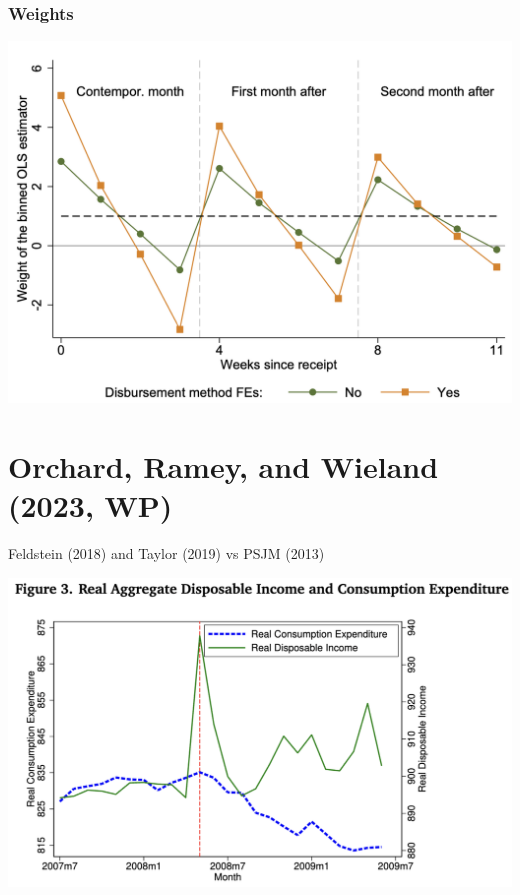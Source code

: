 \documentclass[english,xcolor=svgnames]{beamer}
\begin{document}
\begin{frame}
\frametitle[alignment=center]{Weights}
\centering
\includegraphics[scale=0.5]{figures/BJSFIG3.png}
\end{frame}

\section{Orchard, Ramey, and Wieland (2023, WP)}

\begin{frame}{Feldstein (2018) and Taylor (2019) vs PSJM (2013)}
	
	\begin{center}
		\includegraphics[scale=0.4]{figures/ORWFIG3.png}
	 \end{center} 
\end{frame}
\end{document}

